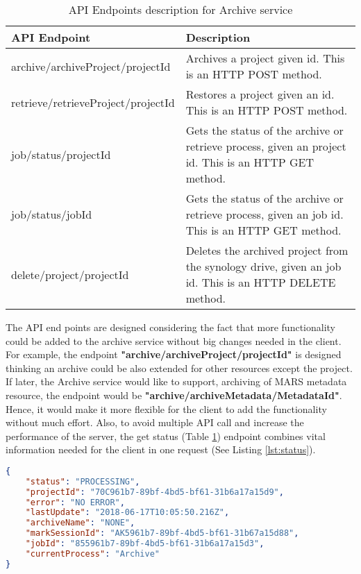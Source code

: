     \begin{table}[H]
        \centering
        \begin{tabular}{|p{6cm}|p{8cm}|}
            \hline
                \textbf{API Endpoint}&\textbf{Description}\\
            \hline
                archive/archiveProject/{{projectId}} & Archives a project given id. This is an HTTP POST method.\\
            \hline
                retrieve/retrieveProject/{{projectId}} & Restores a project given an id. This is an HTTP POST method.\\
            \hline
                job/status/{{projectId}} & Gets the status of the archive or retrieve process, given an project id. This is an HTTP GET method.\\
            \hline
                job/status/{{jobId}} & Gets the status of the archive or retrieve process, given an job id. This is an HTTP GET method.\\
            \hline
                delete/project/{{projectId}} & Deletes the archived project from the synology drive, given an job id. This is an HTTP DELETE method.\\
            \hline
        \end{tabular}
        \caption{API Endpoints description for Archive service}
        \label{table:archiveEndpoints}     
    \end{table}  

    The API end points are designed considering the fact that more functionality could be added to the archive service without big changes needed in the client. 
    For example, the endpoint \textbf{"archive/archiveProject/{{projectId}}"} is designed thinking an archive could be also extended for other resources except the project. If later,
    the Archive service would like to support, archiving of MARS metadata resource, the endpoint would be \textbf{"archive/archiveMetadata/{{MetadataId}}"}.
    Hence, it would make it more flexible for the client to add the functionality without much effort. Also, to avoid multiple API call and
    increase the performance of the server, the get status (Table \ref{table:archiveEndpoints}) endpoint combines vital information needed for the client in one 
    request (See Listing \ref{lst:status}). 
    
\begin{lstlisting}[caption={Sucessful GET request for a archive status}, language=json,firstnumber=1, captionpos=b, label={lst:status}]
{
    "status": "PROCESSING",
    "projectId": "70C961b7-89bf-4bd5-bf61-31b6a17a15d9",
    "error": "NO ERROR",
    "lastUpdate": "2018-06-17T10:05:50.216Z",
    "archiveName": "NONE",
    "markSessionId": "AK5961b7-89bf-4bd5-bf61-31b67a15d88",
    "jobId": "855961b7-89bf-4bd5-bf61-31b6a17a15d3",
    "currentProcess": "Archive"
}
\end{lstlisting}







    
